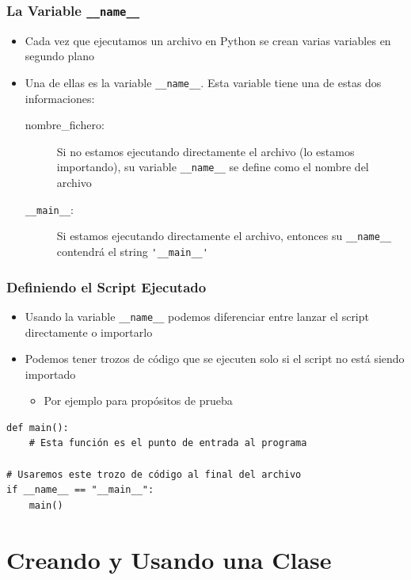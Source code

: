 \documentclass[11pt]{beamer}
\begin{document}
\begin{frame}\frametitle{La Variable \texttt{\_\_name\_\_}}
\begin{itemize}
\item Cada vez que ejecutamos un archivo en Python se crean varias variables en segundo plano
\item Una de ellas es la variable \lstinline|__name__|. Esta variable tiene una de estas dos informaciones:
    \begin{description}
    \item[nombre\_fichero:] Si no estamos ejecutando directamente el archivo (lo estamos importando), su variable \lstinline|__name__| se define como el nombre del archivo
    \item[\texttt{\_\_main\_\_}:] Si estamos ejecutando directamente el archivo, entonces su \lstinline|__name__| contendrá el string \lstinline|'__main__'|
    \end{description} 
\end{itemize}
\end{frame}

\begin{frame}[fragile]\frametitle{Definiendo el Script Ejecutado}
\begin{itemize}
\item Usando la variable \lstinline|__name__| podemos diferenciar entre lanzar el script directamente o importarlo
\item Podemos tener trozos de código que se ejecuten solo si el script no está siendo importado
    \begin{itemize}
    \item Por ejemplo para propósitos de prueba
    \end{itemize}
\end{itemize}
\begin{lstlisting}
def main():
    # Esta función es el punto de entrada al programa

# Usaremos este trozo de código al final del archivo
if __name__ == "__main__":
    main()
\end{lstlisting}
\end{frame}


\section{Creando y Usando una Clase}
\end{document}
